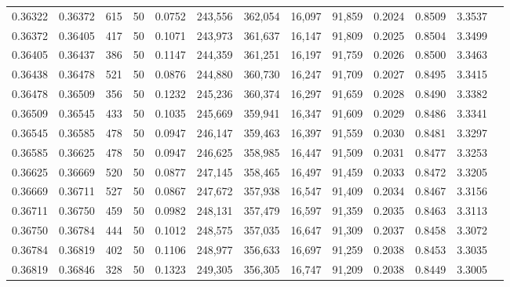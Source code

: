 \begin{tabular}{rrrrrrrrrrrrr}
0.36322 & 0.36372 &   615 &  50 &                                     0.0752 & 243,556 & 362,054 &  16,097 &  91,859 & 0.2024 & 0.8509 & 3.3537 \\
0.36372 & 0.36405 &   417 &  50 &                                     0.1071 & 243,973 & 361,637 &  16,147 &  91,809 & 0.2025 & 0.8504 & 3.3499 \\
0.36405 & 0.36437 &   386 &  50 &                                     0.1147 & 244,359 & 361,251 &  16,197 &  91,759 & 0.2026 & 0.8500 & 3.3463 \\
0.36438 & 0.36478 &   521 &  50 &                                     0.0876 & 244,880 & 360,730 &  16,247 &  91,709 & 0.2027 & 0.8495 & 3.3415 \\
0.36478 & 0.36509 &   356 &  50 &                                     0.1232 & 245,236 & 360,374 &  16,297 &  91,659 & 0.2028 & 0.8490 & 3.3382 \\
0.36509 & 0.36545 &   433 &  50 &                                     0.1035 & 245,669 & 359,941 &  16,347 &  91,609 & 0.2029 & 0.8486 & 3.3341 \\
0.36545 & 0.36585 &   478 &  50 &                                     0.0947 & 246,147 & 359,463 &  16,397 &  91,559 & 0.2030 & 0.8481 & 3.3297 \\
0.36585 & 0.36625 &   478 &  50 &                                     0.0947 & 246,625 & 358,985 &  16,447 &  91,509 & 0.2031 & 0.8477 & 3.3253 \\
0.36625 & 0.36669 &   520 &  50 &                                     0.0877 & 247,145 & 358,465 &  16,497 &  91,459 & 0.2033 & 0.8472 & 3.3205 \\
0.36669 & 0.36711 &   527 &  50 &                                     0.0867 & 247,672 & 357,938 &  16,547 &  91,409 & 0.2034 & 0.8467 & 3.3156 \\
0.36711 & 0.36750 &   459 &  50 &                                     0.0982 & 248,131 & 357,479 &  16,597 &  91,359 & 0.2035 & 0.8463 & 3.3113 \\
0.36750 & 0.36784 &   444 &  50 &                                     0.1012 & 248,575 & 357,035 &  16,647 &  91,309 & 0.2037 & 0.8458 & 3.3072 \\
0.36784 & 0.36819 &   402 &  50 &                                     0.1106 & 248,977 & 356,633 &  16,697 &  91,259 & 0.2038 & 0.8453 & 3.3035 \\
0.36819 & 0.36846 &   328 &  50 &                                     0.1323 & 249,305 & 356,305 &  16,747 &  91,209 & 0.2038 & 0.8449 & 3.3005 \\

\end{tabular}
